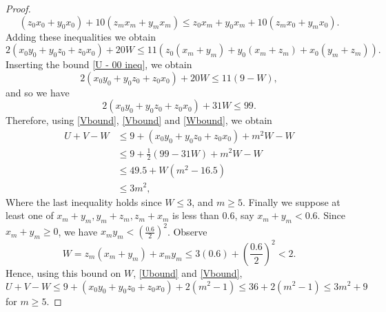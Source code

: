 \documentclass[10pt,a4paper]{amsart}
\begin{document}
\begin{proof}
$$(z_0x_0 + y_0x_0)+10(z_mx_m + y_mx_m) \leq z_0x_m + y_0x_m + 10(z_mx_0 + y_mx_0).$$
Adding these inequalities we obtain \begin{equation*}
    2(x_0y_0 + y_0z_0 + z_0x_0) + 20W \leq 11(z_0(x_m + y_m) + y_0(x_m + z_m) + x_0(y_m + z_m)).
\end{equation*}
Inserting the bound \eqref{U - 00 ineq}, we obtain $$ 2(x_0y_0 + y_0z_0 + z_0x_0) + 20W \leq 11(9-W),$$
and so we have
\begin{equation} \label{Wbound}
        2(x_0y_0 + y_0z_0 + z_0x_0) + 31W \leq 99.
\end{equation}
Therefore, using \eqref{Vbound}, \eqref{Vbound} and \eqref{Wbound}, we obtain \begin{align*}
    U + V - W &\leq 9 + (x_0y_0 + y_0z_0 + z_0x_0) + m^2W - W \\
    & \leq 9 + \frac{1}{2}(99-31W) + m^2W - W \\
    & \leq 49.5 + W(m^2 - 16.5) \\
    & \leq 3m^2, 
\end{align*}
Where the last inequality holds since $W \leq 3$, and $m \geq 5.$
Finally we suppose at least one of $x_m + y_m, y_m + z_m, z_m + x_m$ is less than $0.6$, say $x_m + y_m < 0.6.$ Since $x_m + y_m \geq 0$, we have $x_my_m < (\frac{0.6}{2})^2$. Observe $$W = z_m(x_m + y_m) + x_my_m \leq 3(0.6) + (\frac{0.6}{2})^2 < 2.$$ Hence, using this bound on $W$, \eqref{Ubound} and \eqref{Vbound}, $$U + V - W \leq 9 + (x_0y_0 + y_0z_0 + z_0x_0) + 2(m^2 - 1) \leq 36 + 2(m^2-1) \leq 3m^2 + 9$$ for $m \geq 5.$
\end{proof}
\end{document}
